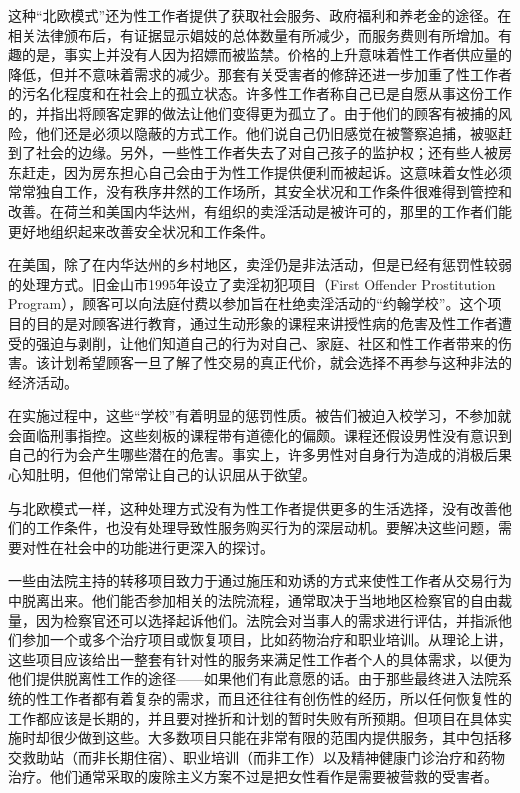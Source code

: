 \documentclass[fontset=fandol, a4paper, 12pt, openright]{ctexbook}
\begin{document}
这种“北欧模式”还为性工作者提供了获取社会服务、政府福利和养老金的途径。在相关法律颁布后，有证据显示娼妓的总体数量有所减少，而服务费则有所增加。有趣的是，事实上并没有人因为招嫖而被监禁。价格的上升意味着性工作者供应量的降低，但并不意味着需求的减少。那套有关受害者的修辞还进一步加重了性工作者的污名化程度和在社会上的孤立状态。许多性工作者称自己已是自愿从事这份工作的，并指出将顾客定罪的做法让他们变得更为孤立了。由于他们的顾客有被捕的风险，他们还是必须以隐蔽的方式工作。他们说自己仍旧感觉在被警察追捕，被驱赶到了社会的边缘。另外，一些性工作者失去了对自己孩子的监护权；还有些人被房东赶走，因为房东担心自己会由于为性工作提供便利而被起诉。这意味着女性必须常常独自工作，没有秩序井然的工作场所，其安全状况和工作条件很难得到管控和改善。在荷兰和美国内华达州，有组织的卖淫活动是被许可的，那里的工作者们能更好地组织起来改善安全状况和工作条件。

在美国，除了在内华达州的乡村地区，卖淫仍是非法活动，但是已经有惩罚性较弱的处理方式。旧金山市1995年设立了卖淫初犯项目（First Offender Prostitution Program），顾客可以向法庭付费以参加旨在杜绝卖淫活动的“约翰学校”。这个项目的目的是对顾客进行教育，通过生动形象的课程来讲授性病的危害及性工作者遭受的强迫与剥削，让他们知道自己的行为对自己、家庭、社区和性工作者带来的伤害。该计划希望顾客一旦了解了性交易的真正代价，就会选择不再参与这种非法的经济活动。

在实施过程中，这些“学校”有着明显的惩罚性质。被告们被迫入校学习，不参加就会面临刑事指控。这些刻板的课程带有道德化的偏颇。课程还假设男性没有意识到自己的行为会产生哪些潜在的危害。事实上，许多男性对自身行为造成的消极后果心知肚明，但他们常常让自己的认识屈从于欲望。

与北欧模式一样，这种处理方式没有为性工作者提供更多的生活选择，没有改善他们的工作条件，也没有处理导致性服务购买行为的深层动机。要解决这些问题，需要对性在社会中的功能进行更深入的探讨。

一些由法院主持的转移项目致力于通过施压和劝诱的方式来使性工作者从交易行为中脱离出来。他们能否参加相关的法院流程，通常取决于当地地区检察官的自由裁量，因为检察官还可以选择起诉他们。法院会对当事人的需求进行评估，并指派他们参加一个或多个治疗项目或恢复项目，比如药物治疗和职业培训。从理论上讲，这些项目应该给出一整套有针对性的服务来满足性工作者个人的具体需求，以便为他们提供脱离性工作的途径——如果他们有此意愿的话。由于那些最终进入法院系统的性工作者都有着复杂的需求，而且还往往有创伤性的经历，所以任何恢复性的工作都应该是长期的，并且要对挫折和计划的暂时失败有所预期。但项目在具体实施时却很少做到这些。大多数项目只能在非常有限的范围内提供服务，其中包括移交救助站（而非长期住宿）、职业培训（而非工作）以及精神健康门诊治疗和药物治疗。他们通常采取的废除主义方案不过是把女性看作是需要被营救的受害者。
\end{document}
